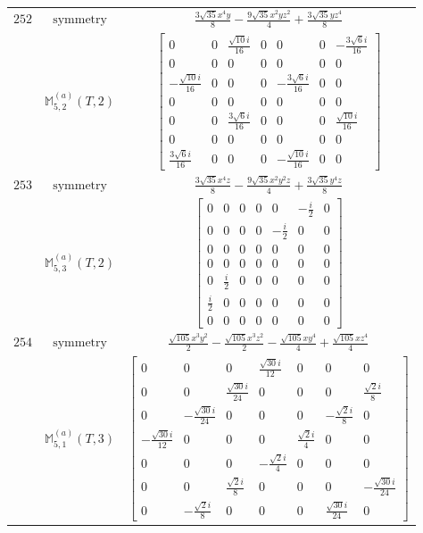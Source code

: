 \documentclass[fleqn,8pt,landscape]{jsarticle}
\begin{document}
\begin{longtable}{ccc}
$ 252 $ & $ \text{symmetry} $ & $ \frac{3 \sqrt{35} x^{4} y}{8} - \frac{9 \sqrt{35} x^{2} y z^{2}}{4} + \frac{3 \sqrt{35} y z^{4}}{8} $ \\
$  $ & $ \mathbb{M}_{5,2}^{(a)}(T,2) $ & $ \begin{bmatrix} 0 & 0 & \frac{\sqrt{10} i}{16} & 0 & 0 & 0 & - \frac{3 \sqrt{6} i}{16} \\ 0 & 0 & 0 & 0 & 0 & 0 & 0 \\ - \frac{\sqrt{10} i}{16} & 0 & 0 & 0 & - \frac{3 \sqrt{6} i}{16} & 0 & 0 \\ 0 & 0 & 0 & 0 & 0 & 0 & 0 \\ 0 & 0 & \frac{3 \sqrt{6} i}{16} & 0 & 0 & 0 & \frac{\sqrt{10} i}{16} \\ 0 & 0 & 0 & 0 & 0 & 0 & 0 \\ \frac{3 \sqrt{6} i}{16} & 0 & 0 & 0 & - \frac{\sqrt{10} i}{16} & 0 & 0 \end{bmatrix} $ \\ \hline
$ 253 $ & $ \text{symmetry} $ & $ \frac{3 \sqrt{35} x^{4} z}{8} - \frac{9 \sqrt{35} x^{2} y^{2} z}{4} + \frac{3 \sqrt{35} y^{4} z}{8} $ \\
$  $ & $ \mathbb{M}_{5,3}^{(a)}(T,2) $ & $ \begin{bmatrix} 0 & 0 & 0 & 0 & 0 & - \frac{i}{2} & 0 \\ 0 & 0 & 0 & 0 & - \frac{i}{2} & 0 & 0 \\ 0 & 0 & 0 & 0 & 0 & 0 & 0 \\ 0 & 0 & 0 & 0 & 0 & 0 & 0 \\ 0 & \frac{i}{2} & 0 & 0 & 0 & 0 & 0 \\ \frac{i}{2} & 0 & 0 & 0 & 0 & 0 & 0 \\ 0 & 0 & 0 & 0 & 0 & 0 & 0 \end{bmatrix} $ \\ \hline
$ 254 $ & $ \text{symmetry} $ & $ \frac{\sqrt{105} x^{3} y^{2}}{2} - \frac{\sqrt{105} x^{3} z^{2}}{2} - \frac{\sqrt{105} x y^{4}}{4} + \frac{\sqrt{105} x z^{4}}{4} $ \\
$  $ & $ \mathbb{M}_{5,1}^{(a)}(T,3) $ & $ \begin{bmatrix} 0 & 0 & 0 & \frac{\sqrt{30} i}{12} & 0 & 0 & 0 \\ 0 & 0 & \frac{\sqrt{30} i}{24} & 0 & 0 & 0 & \frac{\sqrt{2} i}{8} \\ 0 & - \frac{\sqrt{30} i}{24} & 0 & 0 & 0 & - \frac{\sqrt{2} i}{8} & 0 \\ - \frac{\sqrt{30} i}{12} & 0 & 0 & 0 & \frac{\sqrt{2} i}{4} & 0 & 0 \\ 0 & 0 & 0 & - \frac{\sqrt{2} i}{4} & 0 & 0 & 0 \\ 0 & 0 & \frac{\sqrt{2} i}{8} & 0 & 0 & 0 & - \frac{\sqrt{30} i}{24} \\ 0 & - \frac{\sqrt{2} i}{8} & 0 & 0 & 0 & \frac{\sqrt{30} i}{24} & 0 \end{bmatrix} $ \\ \hline

\end{longtable}
\end{document}
